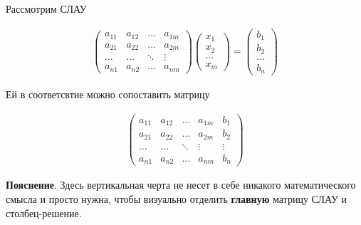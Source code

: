 \documentclass[]{article}
\begin{document}
Рассмотрим СЛАУ

\begin{gather*}
	\begin{pmatrix}
		a_{11} & a_{12} & \ldots & a_{1m}
		\\
		a_{21} & a_{22} & \ldots & a_{2m}
		\\
		\ldots & \ldots & \ddots & \vdots
		\\
		a_{n1} & a_{n2} & \ldots & a_{nm}
	\end{pmatrix}
	\begin{pmatrix}
		x_{1}
		\\
		x_{2}
		\\
		\ldots
		\\
		x_{m}
	\end{pmatrix}
	=
	\begin{pmatrix}
		b_1
		\\
		b_2
		\\
		\ldots
		\\
		b_n
	\end{pmatrix}
\end{gather*}

Ей в соответсвтие можно сопоставить матрицу

\begin{gather*}
	\left(
	\begin{array}{llll|l}
		a_{11} & a_{12} & \ldots & a_{1m} & b_{1}
		\\
		a_{21} & a_{22} & \ldots & a_{2m} & b_{2} 
		\\
		\ldots & \ldots & \ddots & \vdots & \vdots
		\\
		a_{n1} & a_{n2} & \ldots & a_{nm} & b_{n}
	\end{array}
	\right)
\end{gather*}

\textbf{Пояснение}. Здесь вертикальная черта не несет в себе никакого математического смысла и просто нужна, чтобы визуально отделить \textbf{главную} матрицу СЛАУ и столбец-решение.
\end{document}
